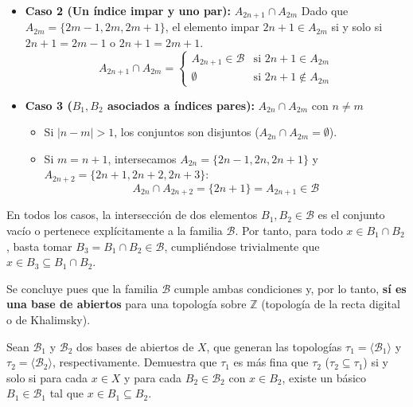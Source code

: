 \begin{sol}
\begin{itemize}
        \item \textbf{Caso 2 (Un índice impar y uno par):} $A_{2n+1} \cap A_{2m}$
        Dado que $A_{2m} = \{2m-1, 2m, 2m+1\}$, el elemento impar $2n+1 \in A_{2m}$ si y solo si $2n+1 = 2m-1$ o $2n+1 = 2m+1$.
        \[
            A_{2n+1} \cap A_{2m} = \begin{cases}
                A_{2n+1} \in \mathcal{B} & \text{si } 2n+1 \in A_{2m} \\
                \emptyset & \text{si } 2n+1 \notin A_{2m}
            \end{cases}
        \]

        \item \textbf{Caso 3 ($B_1, B_2$ asociados a índices pares):} $A_{2n} \cap A_{2m}$ con $n \neq m$
        \begin{itemize}
            \item Si $|n - m| > 1$, los conjuntos son disjuntos ($A_{2n} \cap A_{2m} = \emptyset$).
            \item Si $m = n+1$, intersecamos $A_{2n} = \{2n-1, 2n, 2n+1\}$ y $A_{2n+2} = \{2n+1, 2n+2, 2n+3\}$:
            \[
                A_{2n} \cap A_{2n+2} = \{2n+1\} = A_{2n+1} \in \mathcal{B}
            \]
        \end{itemize}
    \end{itemize}

    En todos los casos, la intersección de dos elementos $B_1, B_2 \in \mathcal{B}$ es el conjunto vacío o pertenece explícitamente a la familia $\mathcal{B}$. Por tanto, para todo $x \in B_1 \cap B_2$, basta tomar $B_3 = B_1 \cap B_2 \in \mathcal{B}$, cumpliéndose trivialmente que $x \in B_3 \subseteq B_1 \cap B_2$.

    \medskip

    Se concluye pues que la familia $\mathcal{B}$ cumple ambas condiciones y, por lo tanto, \textbf{sí es una base de abiertos} para una topología sobre $\mathbb{Z}$ (topología de la recta digital o de Khalimsky).
\end{sol}\begin{ejer}
    [28] Sean $\mathcal{B}_1$ y $\mathcal{B}_2$ dos bases de abiertos de $X$, que generan las topologías $\tau_1 = \langle \mathcal{B}_1 \rangle$ y $\tau_2 = \langle \mathcal{B}_2 \rangle$, respectivamente. Demuestra que $\tau_1$ es más fina que $\tau_2$ ($\tau_2 \subseteq \tau_1$) si y solo si para cada $x \in X$ y para cada $B_2 \in \mathcal{B}_2$ con $x \in B_2$, existe un básico $B_1 \in \mathcal{B}_1$ tal que $x \in B_1 \subseteq B_2$.
\end{ejer}

